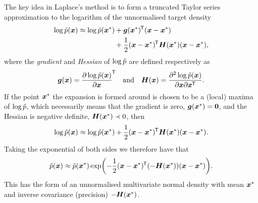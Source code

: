 The key idea in Laplace's method is to form a truncated Taylor series approximation to the logarithm of the unnormalised target density
\begin{equation}\label{eq:log-target-taylor-expansion}
\begin{split}
  \log\tilde{p}(\boldsymbol{x}) \approx 
  \log\tilde{p}(\boldsymbol{x}^*) 
  &+ \boldsymbol{g}(\boldsymbol{x}^*)^{\mkern-1.5mu\mathsf{T}}(\boldsymbol{x}-\boldsymbol{x}^*) \\
  &+ \frac{1}{2} (\boldsymbol{x}-\boldsymbol{x}^*)^{\mkern-1.5mu\mathsf{T}} \boldsymbol{H}(\boldsymbol{x}^*)(\boldsymbol{x}-\boldsymbol{x}^*),\\
\end{split}
\end{equation}
where the \emph{gradient} and \emph{Hessian} of $\log\tilde{p}$ are defined respectively as
\begin{equation}
  \boldsymbol{g}(\boldsymbol{x}) = \frac{\partial \log\tilde{p}(\boldsymbol{x})}{\partial \boldsymbol{x}}^{\mkern-1.5mu\mathsf{T}}
  \quad\textrm{and}\quad
  \boldsymbol{H}(\boldsymbol{x}) = \frac{\partial^2 \log\tilde{p}(\boldsymbol{x})}{\partial \boldsymbol{x} \partial \boldsymbol{x}^{\mkern-1.5mu\mathsf{T}}}.
\end{equation}
If the point $\boldsymbol{x}^*$ the expansion is formed around is chosen to be a (local) maxima of $\log\tilde{p}$, which necessarily means that the gradient is zero, $\boldsymbol{g}(\boldsymbol{x}^*) = \boldsymbol{0}$, and the Hessian is negative definite, $\boldsymbol{H}(\boldsymbol{x}^*) \prec 0$, then
\begin{equation}\label{eq:laplace-approximation-log}
  \log\tilde{p}(\boldsymbol{x}) \approx
  \log\tilde{p}(\boldsymbol{x}^*) + \frac{1}{2} (\boldsymbol{x}-\boldsymbol{x}^*)^{\mkern-1.5mu\mathsf{T}} \boldsymbol{H}(\boldsymbol{x}^*)(\boldsymbol{x}-\boldsymbol{x}^*).
\end{equation}
Taking the exponential of both sides we therefore have that
\begin{equation}\label{eq:laplace-approximation-exp}
  \utgtdens(\vct{x}) \approx
  \utgtdens(\vct{x}^*) \exp\lpa-\frac{1}{2} (\vct{x}-\vct{x}^*)\tr \lpa -\mtx{H}(\vct{x}^*)\rpa(\vct{x}-\vct{x}^*)\rpa.
\end{equation}
This has the form of an unnormalised multivariate normal density with mean $\boldsymbol{x}^*$ and inverse covariance (precision) $-\boldsymbol{H}(\boldsymbol{x}^*)$.

